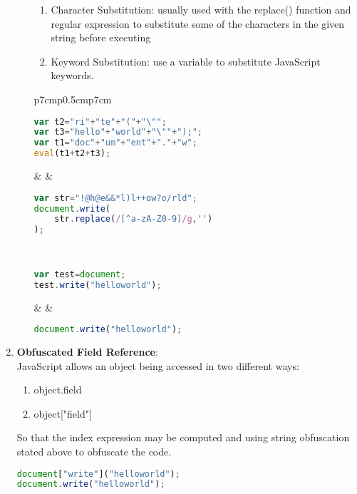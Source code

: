 \begin{enumerate}
\begin{enumerate}
\begin{enumerate}
			\item Character Substitution: usually used with the replace() function and regular expression to substitute some of the characters in the given string before executing
 			\item Keyword Substitution: use a variable to substitute JavaScript keywords.
 		\end{enumerate}
	\begin{tabular}{p{7cm}p{0.5cm}p{7cm}}
			\begin{lstlisting}[language=JavaScript, title=(concatenation)]
var t2="ri"+"te"+"("+"\"";
var t3="hello"+"world"+"\""+");";
var t1="doc"+"um"+"ent"+"."+"w";
eval(t1+t2+t3);
			\end{lstlisting} & & \begin{lstlisting}[language=JavaScript, title=(character substitution)]
var str="!@h@e&&*l)l++ow?o/rld";
document.write(
    str.replace(/[^a-zA-Z0-9]/g,'')
);
			\end{lstlisting} \\ 
			\begin{lstlisting}[language=JavaScript, title=(keyword substitution)]
var test=document;
test.write("helloworld");
			\end{lstlisting}  & & \begin{lstlisting}[language=JavaScript, title=(original code)]
document.write("helloworld");
			\end{lstlisting} 
	\end{tabular}  	 		
 	\end{enumerate}
	\item \textbf{Obfuscated Field Reference}: \\
			JavaScript allows an object being accessed in two different ways: 
			\begin{enumerate}
				\item object.field
				\item object["field"]
			\end{enumerate}
			 So that the index expression may be computed and using string obfuscation stated above to obfuscate the code. \\
			\begin{lstlisting}[language=JavaScript, title=(obfuscated field reference example)]
document["write"]("helloworld");
document.write("helloworld");


\end{lstlisting}
\end{enumerate}
